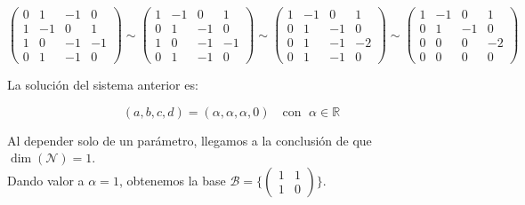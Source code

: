 \begin{itemize}[$\bullet$]
    \begin{equation*}
        \begin{pmatrix}
            0 & 1  & -1 & 0  \\
            1 & -1 & 0  & 1  \\
            1 & 0  & -1 & -1 \\
            0 & 1  & -1 & 0
        \end{pmatrix}
        \sim
        \begin{pmatrix}
            1 & -1 & 0  & 1  \\
            0 & 1  & -1 & 0  \\
            1 & 0  & -1 & -1 \\
            0 & 1  & -1 & 0
        \end{pmatrix}
        \sim
        \begin{pmatrix}
            1 & -1 & 0  & 1  \\
            0 & 1  & -1 & 0  \\
            0 & 1  & -1 & -2 \\
            0 & 1  & -1 & 0
        \end{pmatrix}
        \sim
        \begin{pmatrix}
            1 & -1 & 0  & 1  \\
            0 & 1  & -1 & 0  \\
            0 & 0  & 0  & -2 \\
            0 & 0  & 0  & 0
        \end{pmatrix}
    \end{equation*}

    La solución del sistema anterior es:

    \begin{equation*}
    (a,b,c,d)
        = (\alpha, \alpha, \alpha, 0) \hspace{12pt} \text{con }\;  \alpha \in \mathbb{R}
    \end{equation*}

    Al depender solo de un parámetro, llegamos a la conclusión de que $\dim(\mathcal{N}) = 1$.\\

    Dando valor a $\alpha = 1$, obtenemos la base $\mathcal{B} = \{ \begin{pmatrix}
                                                                        1 & 1 \\
                                                                        1 & 0
    \end{pmatrix}\}$.


\end{itemize}
